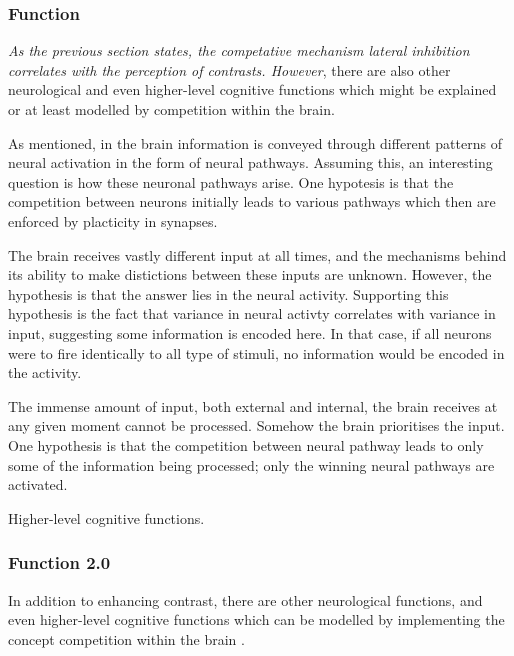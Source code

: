     \subsubsection{Function}
       \textit{As the previous section states, the competative mechanism lateral inhibition correlates with the perception of contrasts. However}, there are also other neurological and even higher-level cognitive functions which might be explained or at least modelled by competition within the brain.

        As mentioned, in the brain information is conveyed through different patterns of neural activation in the form of neural pathways. Assuming this, an interesting question is how these neuronal pathways arise. One hypotesis is that the competition between neurons initially leads to various pathways which then are enforced by placticity in synapses. 
        
        The brain receives vastly different input at all times, and the mechanisms behind its ability to make distictions between these inputs are unknown. However, the  hypothesis is that the answer lies in the neural activity. Supporting this hypothesis is the fact that variance in neural activty correlates with variance in input, suggesting some information is encoded here. In that case, if all neurons were to fire identically to all type of stimuli, no information would be encoded in the activity.

        The immense amount of input, both external and internal, the brain receives at any given moment cannot be processed. Somehow the brain prioritises the input. One hypothesis is that the competition between neural pathway leads to only some of the information being processed; only the winning neural pathways are activated.  
        
        Higher-level cognitive functions. 

    
    \subsubsection{Function 2.0}
        In addition to enhancing contrast, there are other neurological functions, and even higher-level cognitive functions which can be modelled by implementing the concept competition within the brain \citep{Chen}.

